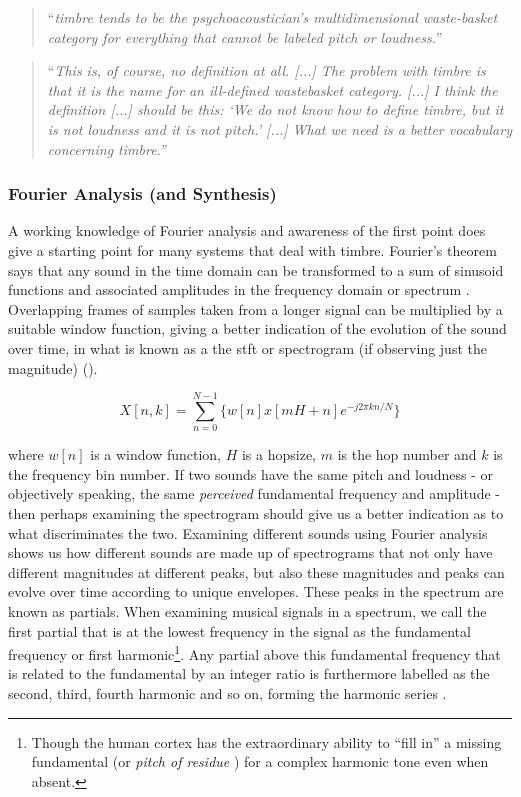 {{\blockcquote[]{McAdams1979}{``\textit{timbre tends to be the psychoacoustician's multidimensional waste-basket category for everything that cannot be labeled pitch or loudness.}''} 

\blockcquote[]{Bregman1994}{``\textit{This is, of course, no definition at all. [...] The problem with timbre is that it is the name for an ill-defined wastebasket category. [...] I think the definition [...] should be this: ‘We do not know how to define timbre, but it is not loudness and it is not pitch.’ [...] What we need is a better vocabulary concerning timbre.''}}

\subsubsection{Fourier Analysis (and Synthesis)}

A working knowledge of Fourier analysis and awareness of the first point \citep{ansi} does give a starting point for many systems that deal with timbre. Fourier's theorem says that any sound in the time domain can be transformed to a sum of sinusoid functions and associated amplitudes in the frequency domain or spectrum \citep{Roads1996}. Overlapping frames of samples taken from a longer signal can be multiplied by a suitable window function, giving a better indication of the evolution of the sound over time, in what is known as a the \acrshort{stft} or spectrogram (if observing just the magnitude) \citep{Collins2010}().

\begin{equation}
\label{eq:stft}
X[n,k] = \sum_{n=0}^{N-1}\{w[n]x[mH+n]e^{-j2\pi kn/N}\}
\end{equation}

where $w[n]$ is a window function, $H$ is a hopsize, $m$ is the hop number and $k$ is the frequency bin number. If two sounds have the same pitch and loudness - or objectively speaking, the same \textit{perceived} fundamental frequency and amplitude - then perhaps examining the spectrogram should give us a better indication as to what discriminates the two. Examining different sounds using Fourier analysis shows us how different sounds are made up of spectrograms that not only have different magnitudes at different peaks, but also these magnitudes and peaks can evolve over time according to unique envelopes. These peaks in the spectrum are known as partials. When examining musical signals in a spectrum, we call the first partial that is at the lowest frequency in the signal as the fundamental frequency or first harmonic\footnote{Though the human cortex has the extraordinary ability to ``fill in'' a missing fundamental (or \textit{pitch of residue} \citep{Weihs2009}) for a complex harmonic tone even when absent.}. Any partial above this fundamental frequency that is related to the fundamental by an integer ratio is furthermore labelled as the second, third, fourth harmonic and so on, forming the harmonic series \citep{Puckette2006}.

}}
